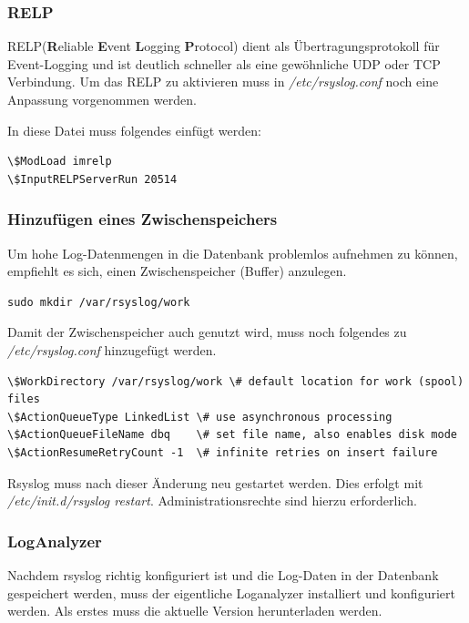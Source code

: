 \subsubsection{RELP}
RELP(\textbf{R}eliable \textbf{E}vent \textbf{L}ogging \textbf{P}rotocol) dient als Übertragungsprotokoll für Event-Logging und ist deutlich schneller als eine gewöhnliche UDP oder TCP Verbindung. Um das RELP zu aktivieren muss in \textit{/etc/rsyslog.conf} noch eine Anpassung vorgenommen werden.

In diese Datei muss folgendes einfügt werden:

\begin{lstlisting}
\$ModLoad imrelp
\$InputRELPServerRun 20514
\end{lstlisting}

\subsubsection{Hinzufügen eines Zwischenspeichers}
Um hohe Log-Datenmengen in die Datenbank problemlos aufnehmen zu können, empfiehlt es sich, einen Zwischenspeicher (Buffer) anzulegen. 
\begin{lstlisting}
sudo mkdir /var/rsyslog/work
\end{lstlisting}

Damit der Zwischenspeicher auch genutzt wird, muss noch folgendes zu \textit{/etc/rsyslog.conf} hinzugefügt werden.

\begin{lstlisting}
\$WorkDirectory /var/rsyslog/work \# default location for work (spool) files
\$ActionQueueType LinkedList \# use asynchronous processing
\$ActionQueueFileName dbq    \# set file name, also enables disk mode
\$ActionResumeRetryCount -1  \# infinite retries on insert failure
\end{lstlisting}

\begin{importantnote}
	Rsyslog muss nach dieser Änderung neu gestartet werden. Dies erfolgt mit \textit{/etc/init.d/rsyslog restart}. Administrationsrechte sind hierzu erforderlich.
\end{importantnote}

\subsubsection{LogAnalyzer}
Nachdem rsyslog richtig konfiguriert ist und die Log-Daten in der Datenbank gespeichert werden, muss der eigentliche Loganalyzer installiert und konfiguriert werden. Als erstes muss die aktuelle Version herunterladen werden.

